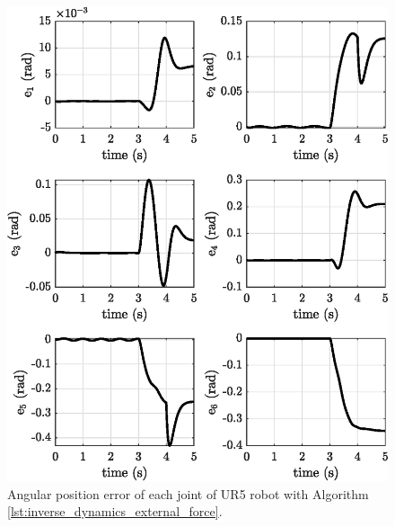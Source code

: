 \begin{figure}[H]
    \centering
    \includegraphics{images/act_2.4_kp_60/e.eps}
    \caption{Angular position error of each joint of UR5 robot with Algorithm \ref{lst:inverse_dynamics_external_force}.}
    \label{fig:act_2.4_kp_60_e}
\end{figure}

